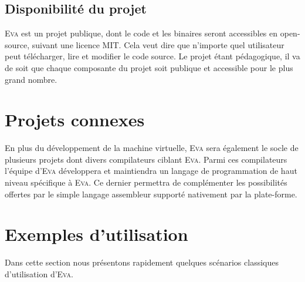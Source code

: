 \documentclass[11pt,twoside]{article}
\newcommand{\noun}[1]{\textsc{#1}}
\begin{document}
\subsection{Disponibilité du projet}

\noun{Eva} est un projet publique, dont le code et les binaires seront
accessibles en open-source, suivant une licence MIT. Cela veut dire
que n'importe quel utilisateur peut télécharger, lire et modifier
le code source. Le projet étant pédagogique, il va de soit que chaque
composante du projet soit publique et accessible pour le plus grand nombre.

\section{Projets connexes}

En plus du développement de la machine virtuelle, \noun{Eva} sera
également le socle de plusieurs projets dont divers compilateurs ciblant
\noun{Eva}. Parmi ces compilateurs l'équipe d'\noun{Eva} développera et maintiendra
un langage de programmation de haut niveau spécifique à \noun{Eva}. Ce dernier
permettra de complémenter les possibilités offertes par le simple langage
assembleur supporté nativement par la plate-forme.

\section{Exemples d’utilisation}

Dans cette section nous présentons rapidement quelques scénarios classiques d'utilisation d'\noun{Eva}.
\end{document}
